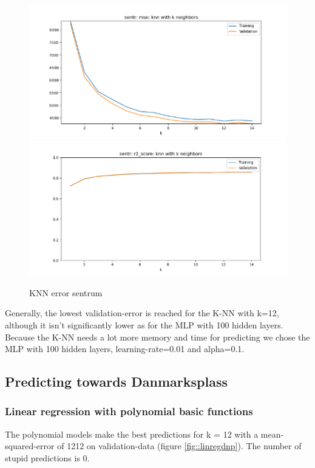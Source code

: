 \documentclass[12pt,a4paper]{scrartcl}		%
\begin{document}
\begin{figure}[h]
    \centering
    \includegraphics[scale = 0.8]{sntr_knn_mse.png}
    \includegraphics[scale = 0.8]{sntr_knn_r2.png}
    \caption{KNN error sentrum}
    \label{fig::knnstr}
\end{figure}

Generally, the lowest validation-error is reached for the K-NN with k=12, although it isn’t significantly lower as for the MLP with 100 hidden layers. 
Because the K-NN needs a lot more memory and time for predicting we chose the MLP with 100 hidden layers, learning-rate=0.01 and alpha=0.1. 

\subsection{Predicting towards Danmarksplass}

\subsubsection{Linear regression with polynomial basic functions}
The polynomial models make the best predictions for k = 12 with a mean-squared-error of 1212 on  validation-data (figure \ref{fig::linregdnp}). 
The number of stupid predictions is 0. 
\end{document}
